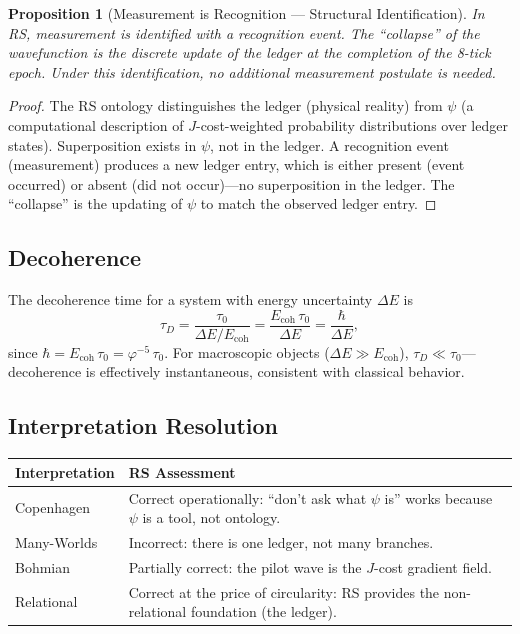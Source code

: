 \documentclass[12pt,a4paper]{article}
\newtheorem{proposition}[theorem]{Proposition}
\theoremstyle{definition}
\theoremstyle{remark}
\begin{document}
\begin{proposition}[Measurement is Recognition --- Structural Identification]
In RS, measurement is identified with a recognition event.  The ``collapse''
of the wavefunction is the discrete update of the ledger at the
completion of the 8-tick epoch.  Under this identification, no
additional measurement postulate is needed.
\end{proposition}

\begin{proof}
The RS ontology distinguishes the ledger (physical reality) from
$\psi$ (a computational description of $J$-cost-weighted probability
distributions over ledger states).  Superposition exists in $\psi$,
not in the ledger.  A recognition event (measurement) produces a new
ledger entry, which is either present (event occurred) or absent
(did not occur)---no superposition in the ledger.  The ``collapse'' is
the updating of $\psi$ to match the observed ledger entry.
\end{proof}

\subsection{Decoherence}

The decoherence time for a system with energy uncertainty $\Delta E$ is
\begin{equation}
  \tau_D = \frac{\tau_0}{\Delta E/E_{\mathrm{coh}}}
  = \frac{E_{\mathrm{coh}}\,\tau_0}{\Delta E}
  = \frac{\hbar}{\Delta E},
\end{equation}
since $\hbar = E_{\mathrm{coh}}\,\tau_0 = \varphi^{-5}\,\tau_0$.
For macroscopic objects ($\Delta E \gg E_{\mathrm{coh}}$),
$\tau_D \ll \tau_0$---decoherence is effectively instantaneous,
consistent with classical behavior.

\subsection{Interpretation Resolution}

\begin{center}
\renewcommand{\arraystretch}{1.3}
\begin{tabular}{@{}lp{8cm}@{}}
\toprule
\textbf{Interpretation} & \textbf{RS Assessment} \\
\midrule
Copenhagen & Correct operationally: ``don't ask what $\psi$ is'' works
because $\psi$ is a tool, not ontology. \\
Many-Worlds & Incorrect: there is one ledger, not many branches. \\
Bohmian & Partially correct: the pilot wave is the $J$-cost gradient
field. \\
Relational & Correct at the price of circularity: RS provides the
non-relational foundation (the ledger). \\
\bottomrule
\end{tabular}
\end{center}
\end{document}
